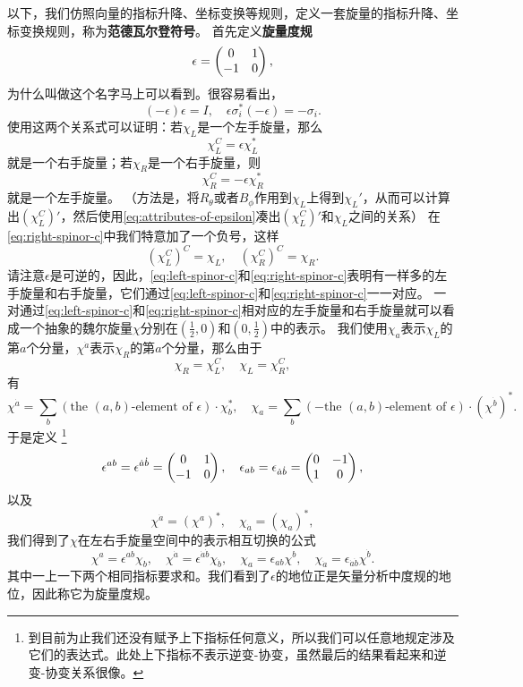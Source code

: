 \documentclass[hyperref, UTF8, a4paper]{ctexart}
\begin{document}
以下，我们仿照向量的指标升降、坐标变换等规则，定义一套旋量的指标升降、坐标变换规则，称为\textbf{范德瓦尔登符号}。
首先定义\textbf{旋量度规}
\begin{equation}
    \epsilon = \pmqty{0 & 1 \\ -1 & 0},
\end{equation}
为什么叫做这个名字马上可以看到。很容易看出，
\begin{equation}
    (-\epsilon) \epsilon = I, \quad \epsilon \sigma_i^* (-\epsilon) = - \sigma_i. 
    \label{eq:attributes-of-epsilon}
\end{equation}
使用这两个关系式可以证明：若$\chi_L$是一个左手旋量，那么
\begin{equation}
    \chi_L^C = \epsilon\chi_L^*
    \label{eq:left-spinor-c}
\end{equation}
就是一个右手旋量；若$\chi_R$是一个右手旋量，则
\begin{equation}
    \chi_R^C = -\epsilon \chi_R^*
    \label{eq:right-spinor-c}
\end{equation}
就是一个左手旋量。
（方法是，将$R_\theta$或者$B_\phi$作用到$\chi_L$上得到$\chi_L'$，从而可以计算出$(\chi_L^C)'$，然后使用\eqref{eq:attributes-of-epsilon}凑出$(\chi_L^C)'$和$\chi_L$之间的关系）
在\eqref{eq:right-spinor-c}中我们特意加了一个负号，这样
\[
    (\chi_L^C)^C = \chi_L, \quad (\chi_R^C)^C = \chi_R.
\]
请注意$\epsilon$是可逆的，因此，\eqref{eq:left-spinor-c}和\eqref{eq:right-spinor-c}表明有一样多的左手旋量和右手旋量，它们通过\eqref{eq:left-spinor-c}和\eqref{eq:right-spinor-c}一一对应。
一对通过\eqref{eq:left-spinor-c}和\eqref{eq:right-spinor-c}相对应的左手旋量和右手旋量就可以看成一个抽象的魏尔旋量$\chi$分别在$(\frac{1}{2},0)$和$(0, \frac{1}{2})$中的表示。
我们使用$\chi_a$表示$\chi_L$的第$a$个分量，$\chi^{\dot{a}}$表示$\chi_R$的第$a$个分量，那么由于
\[
    \chi_R = \chi_L^C, \quad \chi_L = \chi_R^C,
\]
有
\[
    \chi^{\dot{a}} = \sum_b (\text{the $(a,b)$-element of $\epsilon$}) \cdot \chi_b^*, \quad \chi_a = \sum_b ( - \text{the $(a,b)$-element of $\epsilon$}) \cdot (\chi^{\dot{b}})^*.
\]
于是定义%
\footnote{到目前为止我们还没有赋予上下指标任何意义，所以我们可以任意地规定涉及它们的表达式。此处上下指标不表示逆变-协变，虽然最后的结果看起来和逆变-协变关系很像。}
\begin{equation}
    \epsilon^{ab} = \epsilon^{\dot{a} \dot{b}} = \pmqty{0 & 1 \\ -1 & 0}, \quad \epsilon_{ab} = \epsilon_{\dot{a} \dot{b}} = \pmqty{0 & -1 \\ 1 & 0},
\end{equation}
以及
\begin{equation}
    \chi^{\dot{a}} = (\chi^a)^*, \quad \chi_{\dot{a}} = (\chi_a)^*,
\end{equation}
我们得到了$\chi$在左右手旋量空间中的表示相互切换的公式
\begin{equation}
    \chi^a = \epsilon^{ab} \chi_b, \quad \chi^{\dot{a}} = \epsilon^{\dot{a} \dot{b}} \chi_{\dot{b}}, \quad \chi_a = \epsilon_{ab} \chi^b, \quad \chi_{\dot{a}} = \epsilon_{\dot{a} \dot{b}} \chi^{\dot{b}}.
\end{equation}
其中一上一下两个相同指标要求和。我们看到了$\epsilon$的地位正是矢量分析中度规的地位，因此称它为旋量度规。
\end{document}

